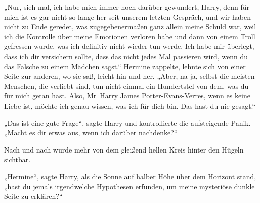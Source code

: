 „Nur, sieh mal, ich habe mich immer noch darüber gewundert, Harry, denn für mich ist es gar nicht so lange her seit unserem letzten Gespräch, und wir haben nicht zu Ende geredet, was zugegebenermaßen ganz allein meine Schuld war, weil ich die Kontrolle über meine Emotionen verloren habe und dann von einem Troll gefressen wurde, was ich definitiv nicht wieder tun werde. Ich habe mir überlegt, dass ich dir versichern sollte, dass das nicht jedes Mal passieren wird, wenn du das Falsche zu einem Mädchen sagst.“
Hermine zappelte, lehnte sich von einer Seite zur anderen, wo sie saß, leicht hin und her.
„Aber, na ja, selbst die meisten Menschen, die verliebt sind, tun nicht einmal ein Hundertstel von dem, was du für mich getan hast. Also, Mr~Harry James Potter-Evans-Verres, wenn es keine Liebe ist, möchte ich genau wissen, was ich für dich bin. Das hast du nie gesagt.“

„Das ist eine gute Frage“, sagte Harry und kontrollierte die aufsteigende Panik. „Macht es dir etwas aus, wenn ich darüber nachdenke?“

Nach und nach wurde mehr von dem gleißend hellen Kreis hinter den Hügeln sichtbar.

„Hermine“, sagte Harry, als die Sonne auf halber Höhe über dem Horizont stand,
„hast du jemals irgendwelche Hypothesen erfunden, um meine mysteriöse dunkle Seite zu erklären?“

